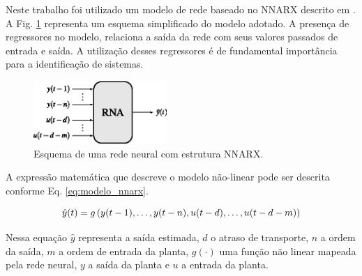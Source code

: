 
Neste trabalho foi utilizado um modelo de rede baseado no NNARX descrito em
. A Fig. \ref{fig:nnarx} representa um esquema
simplificado do modelo adotado. A presença de regressores no modelo, relaciona a
saída da rede com seus valores passados de entrada e saída. A utilização desses
regressores é de fundamental importância para a identificação de sistemas.

\begin{figure}[htb]
\centering
\includegraphics[width=0.45\textwidth]{imgs/rnas/eps/nnarx}
\caption{Esquema de uma rede neural com estrutura NNARX.}
\label{fig:nnarx}
\end{figure}


A expressão matemática que descreve o modelo não-linear pode ser descrita
conforme Eq. \ref{eq:modelo_nnarx}.

\begin{equation}
\label{eq:modelo_nnarx}
\hat{y}(t) = g\left(y(t-1), \ldots, y(t-n), u(t-d), \ldots, u(t-d-m)\right)
\end{equation}


Nessa equação $\hat{y}$ representa a saída estimada, $d$ o atraso de transporte,
$n$ a ordem da saída, $m$ a ordem de entrada da planta, $g( \cdotp )$ uma função
não linear mapeada pela rede neural, $y$ a saída da planta e $u$ a entrada da
planta.

